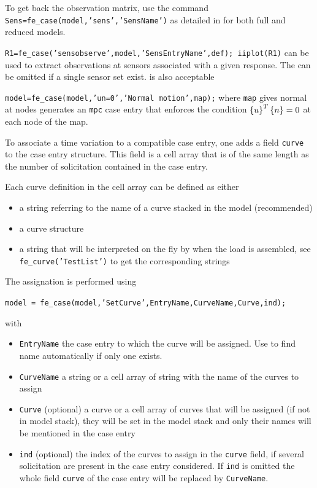 To get back the observation matrix, use the command {\tt Sens=fe\_case(model,'sens','SensName')} as detailed in  for both full and reduced models.

{\tt R1=fe\_case('sensobserve',model,'SensEntryName',def); iiplot(R1)} can be used to extract observations at sensors associated with a given response. The  can be omitted if a single sensor set exist.  is also acceptable 


{\tt model=fe\_case(model,'un=0','Normal motion',map);} where {\tt map} gives normal at nodes generates an {\tt mpc} case entry that enforces the condition $\left\{u\right\}^T\left\{n\right\}=0$ at each node of the map.



To associate a time variation to a compatible case entry, one adds a field {\tt curve} to the case entry structure. This field is a cell array that is of the same length as the number of solicitation contained in the case entry. 

Each curve definition in the cell array can be defined as either
\begin{itemize}
\item a string referring to the name of a curve stacked in the model (recommended)
\item a curve structure
\item a string that will be interpreted on the fly by \fecurve when the load is assembled, see {\tt fe\_curve('TestList')} to get the corresponding strings
\end{itemize}

The assignation is performed using 

{\tt model = fe\_case(model,'SetCurve',EntryName,CurveName,Curve,ind);}

with
\begin{itemize}
\item {\tt EntryName} the case entry to which the curve will be assigned. Use  to find name automatically if only one exists. 
\item {\tt CurveName} a string or a cell array of string with the name of the curves to assign
\item {\tt Curve} (optional)  a curve or a cell array of curves that will be assigned (if not in model stack), they will be set in the model stack and only their names will be mentioned in the case entry
\item {\tt ind} (optional) the index of the curves to assign in the {\tt curve} field, if several solicitation are present in the case entry considered. If {\tt ind} is omitted the whole field {\tt curve} of the case entry will be replaced by {\tt CurveName}.
\end{itemize}

